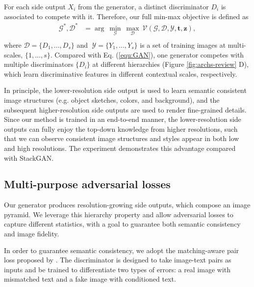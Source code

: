 \documentclass[10pt,twocolumn,letterpaper]{article}
\begin{document}
For each side output $X_i$ from the generator, a distinct discriminator $D_i$ is associated to compete with it. Therefore, our full min-max objective is defined as 
\begin{equation}
\label{equ:optim}
\begin{split}
  \mathcal{G}^*, \mathcal{D}^*&  =  \arg~\underset{\mathcal{G}}{\min}\ \underset{\mathcal{D}}{\max}~ \mathcal{V}(\mathcal{G},\mathcal{D}, \mathcal{Y}, \bm t, \bm z), \\
\end{split}
\end{equation}
where $\mathcal{D}  =  \{D_1, ..., D_s\} $ and $\; \mathcal{Y} = \{Y_1, ..., Y_s\}$ is a set of training images at multi-scales, $\{1,...,s\}$.
Compared with Eq. (\ref{equ:GAN}), one generator competes with multiple discriminators  $\{D_i\}$ at different hierarchies (Figure \ref{fig:archs-review} D), which learn discriminative features in different contextual scales, respectively.

In principle, the lower-resolution side output is used to learn semantic consistent image structures (e.g. object sketches, colors, and background), and the subsequent higher-resolution side outputs are used to render fine-grained details. Since our method is trained in an end-to-end manner, the lower-resolution side outputs can fully enjoy the top-down knowledge from higher resolutions, such that we can observe consistent image structures and styles appear in both low and high resolutions.
The experiment demonstrates this advantage compared with StackGAN. 


\subsection{Multi-purpose adversarial losses}
Our generator produces resolution-growing side outputs, which compose an image pyramid. 
We leverage this hierarchy property and allow adversarial losses to capture different statistics, with a goal to guarantee both semantic consistency and image fidelity. 

In order to guarantee semantic consistency, we adopt the matching-aware pair loss proposed by \cite{reed2016generative}. The discriminator is designed to take image-text pairs as inputs and be trained to differentiate two types of errors: a real image with mismatched text and a fake image with conditioned text.
\end{document}
